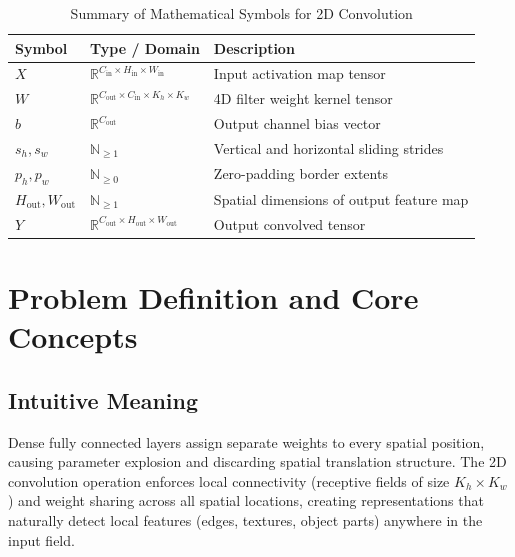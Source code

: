 \documentclass[11pt,a4paper]{article}
\theoremstyle{definition}
\begin{document}
\begin{table}[h]
\centering
\caption{Summary of Mathematical Symbols for 2D Convolution}
\begin{tabular}{lll}
\toprule
\textbf{Symbol} & \textbf{Type / Domain} & \textbf{Description} \\
\midrule
$X$ & $\mathbb{R}^{C_{\text{in}} \times H_{\text{in}} \times W_{\text{in}}}$ & Input activation map tensor \\
$W$ & $\mathbb{R}^{C_{\text{out}} \times C_{\text{in}} \times K_h \times K_w}$ & 4D filter weight kernel tensor \\
$b$ & $\mathbb{R}^{C_{\text{out}}}$ & Output channel bias vector \\
$s_h, s_w$ & $\mathbb{N}_{\ge 1}$ & Vertical and horizontal sliding strides \\
$p_h, p_w$ & $\mathbb{N}_{\ge 0}$ & Zero-padding border extents \\
$H_{\text{out}}, W_{\text{out}}$ & $\mathbb{N}_{\ge 1}$ & Spatial dimensions of output feature map \\
$Y$ & $\mathbb{R}^{C_{\text{out}} \times H_{\text{out}} \times W_{\text{out}}}$ & Output convolved tensor \\
\bottomrule
\end{tabular}
\end{table}

\section{Problem Definition and Core Concepts}

\subsection{Intuitive Meaning}
Dense fully connected layers assign separate weights to every spatial position, causing parameter explosion and discarding spatial translation structure. The 2D convolution operation enforces local connectivity (receptive fields of size $K_h \times K_w$) and weight sharing across all spatial locations, creating representations that naturally detect local features (edges, textures, object parts) anywhere in the input field.
\end{document}
